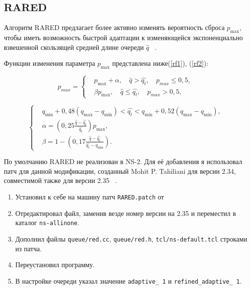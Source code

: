 \subsection{RARED}

Алгоритм RARED предлагает более активно изменять вероятность сброса $p_{\max}$,
чтобы иметь возможность быстрой адаптации к изменяющейся
экспоненциально взвешенной скользящей средней длине очереди $\hat{q}$ ~\cite{RARED}.

Функции изменения параметра $p_{\max}$ представлена ниже(\eqref{rf1}), (\eqref{rf2}):

\begin{equation}
\label{rf1}
p_{max} = \left\{
  \begin{aligned}
& p_{\max}+\alpha, \quad  \hat{q}>\hat{q_{t}}, \quad p_{max} \leqslant 0,5, \\
& \beta p_{\max}, \quad \hat{q}\leqslant\hat{q_{t}}, \quad p_{max} > 0,5,
  \end{aligned}
\right.
\end{equation}

\begin{equation}
\label{rf2}
\left\{
  \begin{aligned}
    & q_{\min}+0,48\left(q_{\max}-q_{\min}\right) < \hat{q_t} < q_{\min}+0,52\left(q_{\max}-q_{\min}\right), \\
    & \alpha=\left(0,25\frac{\hat{q}-\hat{q_t}}{\hat{q_t}} \right)p_{\max}, \\ 
    & \beta=1-\left(0,17\frac{\hat{q}-\hat{q_t}}{\hat{q_t}-q_{\min}}\right).
  \end{aligned}
\right.
\end{equation}


По умолчанию RARED не реализован в NS-2. Для её добавления я использовал патч для данной модификации, созданный Mohit
  P. Tahiliani для версии 2.34, совместимой также для версии 2.35 ~\cite{refinedpatch}. 

\begin{enumerate}
\item Установил к себе на машину патч \verb|RARED.patch| от 
\item Отредактировал файл, заменив везде номер версии на 2.35 и переместил в каталог \verb|ns-allinone|.
\item Дополнил файлы \verb|queue/red.cc|, \verb|queue/red.h|, \verb|tcl/ns-default.tcl| строками из патча.
\item Переустановил программу.
\item В настройке очереди указал значение \verb|adaptive_ 1| и 
\verb|refined_adaptive_ 1|.
\end{enumerate}
 

